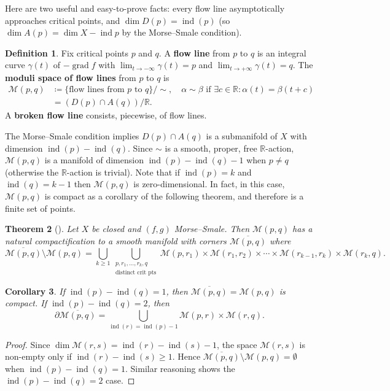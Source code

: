 \documentclass{report}
\theoremstyle{plain}
\newtheorem{theorem}{Theorem}[section]
\newtheorem{corollary}[theorem]{Corollary}
\theoremstyle{definition}
\newtheorem{definition}[theorem]{Definition}
\theoremstyle{remark}
\newcommand{\di}{\partial}
\newcommand{\bR}{\mathbb{R}}
\newcommand{\cM}{\mathcal{M}}
\DeclareMathOperator{\grad}{grad}
\DeclareMathOperator{\ind}{ind}
\begin{document}
Here are two useful and easy-to-prove facts: every flow line
asymptotically approaches critical points, and $\dim D(p) = \ind(p)$
(so $\dim A(p) = \dim X - \ind p$ by the Morse--Smale condition).

\begin{definition}
  Fix critical points $p$ and $q$. A {\bf flow line} from $p$ to $q$
  is an integral curve $\gamma(t)$ of $-\grad f$ with $\lim_{t \to
    -\infty} \gamma(t) = p$ and $\lim_{t \to +\infty} \gamma(t) = q$.
  The {\bf moduli space of flow lines} from $p$ to $q$ is
  \begin{align*}
    \cM(p, q) &\coloneqq \{\text{flow lines from } p \text{ to } q\}/\sim,
    \quad \alpha \sim \beta \text{ if } \exists c \in \bR : \alpha(t) = \beta(t + c) \\
    &= (D(p) \cap A(q)) / \bR.
  \end{align*}
  A {\bf broken flow line} consists, piecewise, of flow lines.
\end{definition}

The Morse--Smale condition implies $D(p) \cap A(q)$ is a submanifold
of $X$ with dimension $\ind(p) - \ind(q)$. Since $\sim$ is a smooth,
proper, free $\bR$-action, $\cM(p, q)$ is a manifold of dimension
$\ind(p) - \ind(q) - 1$ when $p \neq q$ (otherwise the $\bR$-action is
trivial). Note that if $\ind(p) = k$ and $\ind(q) = k-1$ then $\cM(p,
q)$ is zero-dimensional. In fact, in this case, $\cM(p, q)$ is compact
as a corollary of the following theorem, and therefore is a finite set
of points.

\begin{theorem}[{\cite[Theorem 2.1]{Hutchings2012}}]
  Let $X$ be closed and $(f, g)$ Morse--Smale. Then $\cM(p, q)$ has a
  natural compactification to a smooth manifold with corners
  $\overline{\cM(p, q)}$ where
  \[ \overline{\cM(p, q)} \setminus \cM(p, q) = \bigcup_{k \ge 1} \bigcup_{\substack{p,r_1,\ldots,r_k,q\\\text{distinct crit pts}}} \cM(p, r_1) \times \cM(r_1, r_2) \times \cdots \times \cM(r_{k-1}, r_k) \times \cM(r_k, q). \]
\end{theorem}

\begin{corollary}
  If $\ind(p) - \ind(q) = 1$, then $\overline{\cM(p, q)} = \cM(p, q)$
  is compact. If $\ind(p) - \ind(q) = 2$, then
  \[ \di \overline{\cM(p, q)} = \bigcup_{\ind(r) = \ind(p)-1} \cM(p, r) \times \cM(r, q). \]
\end{corollary}

\begin{proof}
  Since $\dim \cM(r, s) = \ind(r) - \ind(s) - 1$, the space $\cM(r,
  s)$ is non-empty only if $\ind(r) - \ind(s) \ge 1$. Hence
  $\overline{\cM(p, q)}\setminus \cM(p, q) = \emptyset$ when $\ind(p)
  - \ind(q) = 1$. Similar reasoning shows the $\ind(p) - \ind(q) = 2$
  case.
\end{proof}
\end{document}

